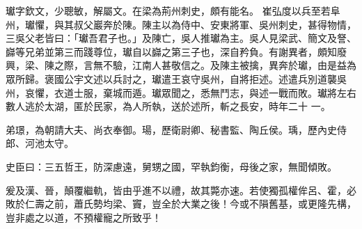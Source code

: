 \begin{pinyinscope}
 瓛字欽文，少聰敏，解屬文。在梁為荊州刺史，頗有能名。
 崔弘度以兵至若阜州，瓛懼，與其叔父巖奔於陳。陳主以為侍中、安東將軍、吳州刺史，甚得物情，三吳父老皆曰：「瓛吾君子也。」及陳亡，吳人推瓛為主。吳人見梁武、簡文及詧、巋等兄弟並第三而踐尊位，瓛自以巋之第三子也，深自矜負。有謝異者，頗知廢興，梁、陳之際，言無不驗，江南人甚敬信之。及陳主被擒，異奔於瓛，由是益為眾所歸。褒國公宇文述以兵討之，瓛遣王哀守吳州，自將拒述。述遣兵別道襲吳州，哀懼，衣道士服，棄城而遁。瓛眾聞之，悉無鬥志，與述一戰而敗。瓛將左右數人逃於太湖，匿於民家，為人所執，送於述所，斬之長安，時年二十
 一。



 弟璟，為朝請大夫、尚衣奉御。瑒，歷衛尉卿、秘書監、陶丘侯。瑀，歷內史侍郎、河池太守。



 史臣曰：三五哲王，防深慮遠，舅甥之國，罕執鈞衡，母後之家，無聞傾敗。



 爰及漢、晉，顛覆繼軌，皆由乎進不以禮，故其斃亦速。若使獨孤權侔呂、霍，必敗於仁壽之前，蕭氏勢均梁、竇，豈全於大業之後！今或不隕舊基，或更隆先構，豈非處之以道，不預權寵之所致乎！



\end{pinyinscope}